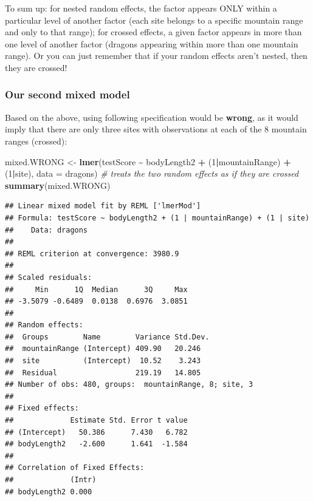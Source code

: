 \documentclass[
]{article}
\newenvironment{Shaded}{\begin{snugshade}}{\end{snugshade}}
\newcommand{\AttributeTok}[1]{\textcolor[rgb]{0.13,0.29,0.53}{#1}}
\newcommand{\CommentTok}[1]{\textcolor[rgb]{0.56,0.35,0.01}{\textit{#1}}}
\newcommand{\DecValTok}[1]{\textcolor[rgb]{0.00,0.00,0.81}{#1}}
\newcommand{\FunctionTok}[1]{\textcolor[rgb]{0.13,0.29,0.53}{\textbf{#1}}}
\newcommand{\NormalTok}[1]{#1}
\newcommand{\OtherTok}[1]{\textcolor[rgb]{0.56,0.35,0.01}{#1}}
\newcommand{\SpecialCharTok}[1]{\textcolor[rgb]{0.81,0.36,0.00}{\textbf{#1}}}
\begin{document}
To sum up: for nested random effects, the factor appears ONLY within a
particular level of another factor (each site belongs to a specific
mountain range and only to that range); for crossed effects, a given
factor appears in more than one level of another factor (dragons
appearing within more than one mountain range). Or you can just remember
that if your random effects aren't nested, then they are crossed!

\subsubsection{Our second mixed model}\label{our-second-mixed-model}

Based on the above, using following specification would be
\textbf{wrong}, as it would imply that there are only three sites with
observations at each of the 8 mountain ranges (crossed):

\begin{Shaded}
\begin{Highlighting}[]
\NormalTok{mixed.WRONG }\OtherTok{\textless{}{-}} \FunctionTok{lmer}\NormalTok{(testScore }\SpecialCharTok{\textasciitilde{}}\NormalTok{ bodyLength2 }\SpecialCharTok{+}\NormalTok{ (}\DecValTok{1}\SpecialCharTok{|}\NormalTok{mountainRange) }\SpecialCharTok{+}\NormalTok{ (}\DecValTok{1}\SpecialCharTok{|}\NormalTok{site), }\AttributeTok{data =}\NormalTok{ dragons)  }\CommentTok{\# treats the two random effects as if they are crossed}
\FunctionTok{summary}\NormalTok{(mixed.WRONG)}
\end{Highlighting}
\end{Shaded}

\begin{verbatim}
## Linear mixed model fit by REML ['lmerMod']
## Formula: testScore ~ bodyLength2 + (1 | mountainRange) + (1 | site)
##    Data: dragons
## 
## REML criterion at convergence: 3980.9
## 
## Scaled residuals: 
##     Min      1Q  Median      3Q     Max 
## -3.5079 -0.6489  0.0138  0.6976  3.0851 
## 
## Random effects:
##  Groups        Name        Variance Std.Dev.
##  mountainRange (Intercept) 409.90   20.246  
##  site          (Intercept)  10.52    3.243  
##  Residual                  219.19   14.805  
## Number of obs: 480, groups:  mountainRange, 8; site, 3
## 
## Fixed effects:
##             Estimate Std. Error t value
## (Intercept)   50.386      7.430   6.782
## bodyLength2   -2.600      1.641  -1.584
## 
## Correlation of Fixed Effects:
##             (Intr)
## bodyLength2 0.000
\end{verbatim}
\end{document}
